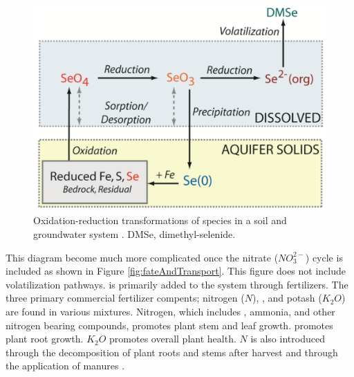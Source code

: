 \begin{linenumbers}[1]
\begin{figure}[!htbp]
	\centering
	\includegraphics[scale=.6]{"Figures/SeRedOx"}
	\caption[Oxidation-reduction transformations of \Se species in a soil and groundwater system.]{Oxidation-reduction transformations of \Se species in a soil and groundwater system  \parencite{Bailey2012}.  DMSe, dimethyl-selenide.}
	\label{fig:SeRedOx}
\end{figure}

This diagram become much more complicated once the nitrate ($ NO_3^{2-} $) cycle is included as shown in Figure \ref{fig:fateAndTransport}.  This figure does not include volatilization pathways.  \nitrate is primarily added to the system through fertilizers.  The three primary commercial fertilizer compents; nitrogen ($N$), \phosphate, and potash ($K_2O$) are found in various mixtures.  Nitrogen, which includes \nitrate, ammonia, and other nitrogen bearing compounds, promotes plant stem and leaf growth. \phosphate promotes plant root growth.  $K_2O$ promotes overall plant health.  $N$ is also introduced through the decomposition of plant roots and stems after harvest and through the application of manures \parencite{Bailey2012}. 


\end{linenumbers}
